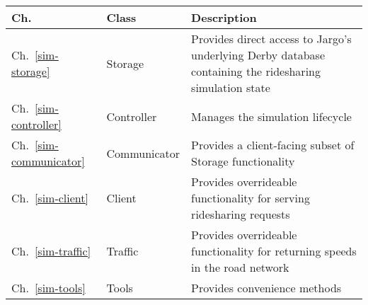 \begin{tabular}{|l|l|p{120mm}|}
\hline
Ch. & Class & Description \\
\hline
Ch.~\ref{sim-storage} & Storage & Provides direct access to Jargo's underlying Derby database containing
the ridesharing simulation state \\
Ch.~\ref{sim-controller} & Controller & Manages the simulation lifecycle \\
Ch.~\ref{sim-communicator} & Communicator & Provides a client-facing subset of Storage functionality \\
Ch.~\ref{sim-client} & Client & Provides overrideable functionality for serving ridesharing requests \\
Ch.~\ref{sim-traffic} & Traffic & Provides overrideable functionality for returning speeds in the road network \\
Ch.~\ref{sim-tools} & Tools & Provides convenience methods \\
\hline
\end{tabular}
